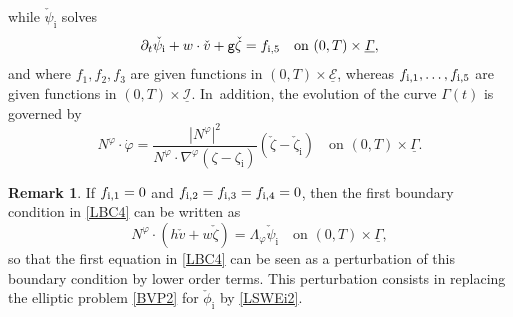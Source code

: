 \documentclass[10pt]{amsart}
\newcommand{\gr}{{\mathtt g}}
\newcommand{\dt}{\partial_t}
\newcommand{\cI}{{\mathcal I}}
\newcommand{\cE}{{\mathcal E}}
\newcommand{\ul}[1]{\underline{#1}}
\newcommand{\itGamma}{\mathit{\Gamma}}
\theoremstyle{definition}
\newtheorem{remark}[theorem]{Remark}
\begin{document}
while $\check{\psi}_\mathrm{i}$ solves
\begin{equation}\label{LBC4bis}
\dt\check{\psi}_\mathrm{i}+w\cdot\check{v}+\gr\check{\zeta}=f_{{\rm i},5} \quad \text{on } (0,T)\times\ul{\itGamma},
\end{equation}
and where $f_1,f_2,f_3$ are given functions in $(0,T)\times\ul{\cE}$, whereas $f_{{\rm i},1},\ldots,f_{{\rm i},5}$ are given functions in $(0,T)\times\ul{\cI}$. In~addition, the evolution of the curve $\itGamma(t)$ is governed by
\begin{equation}\label{EqPhibis}
N^\varphi\cdot\dot{\varphi} = \frac{|N^\varphi|^2}{N^\varphi\cdot\nabla^\varphi(\zeta-\zeta_\mathrm{i})}(\check{\zeta} -\check{\zeta}_\mathrm{i})
\quad\text{on } (0,T)\times\ul{\itGamma}.
\end{equation}

\begin{remark}
If $f_{{\rm i},1}=0$ and $f_{{\rm i},2}=f_{{\rm i},3}=f_{{\rm i},4}=0$, then the first boundary condition in \eqref{LBC4} can be written as
\[
N^\varphi\cdot(h\check{v}+w\check{\zeta}) = \Lambda_\varphi \check{\psi}_\mathrm{i}\quad \text{on } (0,T)\times \ul{\itGamma},
\]
so that the first equation in \eqref{LBC4} can be seen as a perturbation of this boundary condition by lower order terms.
This perturbation consists in replacing the elliptic problem \eqref{BVP2} for $\check{\phi}_\mathrm{i}$ by \eqref{LSWEi2}.
\end{remark}
\end{document}
